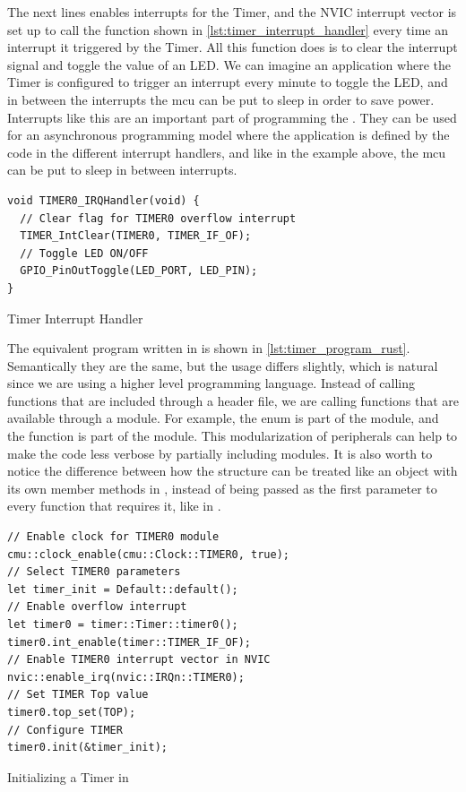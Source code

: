 The next lines enables interrupts for the Timer, and the NVIC interrupt vector is set up to call the function shown in \autoref{lst:timer_interrupt_handler} every time an interrupt it triggered by the Timer.
All this function does is to clear the interrupt signal and toggle the value of an LED.
We can imagine an application where the Timer is configured to trigger an interrupt every minute to toggle the LED, and in between the interrupts the \gls{mcu} can be put to sleep in order to save power.
Interrupts like this are an important part of programming the {\gecko}.
They can be used for an asynchronous programming model where the application is defined by the code in the different interrupt handlers, and like in the example above, the \gls{mcu} can be put to sleep in between interrupts.

\begin{listing}[h]
\begin{verbatim}
void TIMER0_IRQHandler(void) {
  // Clear flag for TIMER0 overflow interrupt
  TIMER_IntClear(TIMER0, TIMER_IF_OF);
  // Toggle LED ON/OFF
  GPIO_PinOutToggle(LED_PORT, LED_PIN);
}
\end{verbatim}
\caption{Timer Interrupt Handler}
\label{lst:timer_interrupt_handler}
\end{listing}

The equivalent program written in {\rust} is shown in \autoref{lst:timer_program_rust}.
Semantically they are the same, but the usage differs slightly, which is natural since we are using a higher level programming language.
Instead of calling functions that are included through a {\C} header file, we are calling functions that are available through a {\rust} module.
For example, the  enum is part of the  module, and the  function is part of the  module.
This modularization of peripherals can help to make the code less verbose by partially including modules.
It is also worth to notice the difference between how the  structure can be treated like an object with its own member methods in {\rust}, instead of being passed as the first parameter to every function that requires it, like in {\C}.

\begin{listing}[h]
\begin{verbatim}
// Enable clock for TIMER0 module
cmu::clock_enable(cmu::Clock::TIMER0, true);
// Select TIMER0 parameters
let timer_init = Default::default();
// Enable overflow interrupt
let timer0 = timer::Timer::timer0();
timer0.int_enable(timer::TIMER_IF_OF);
// Enable TIMER0 interrupt vector in NVIC
nvic::enable_irq(nvic::IRQn::TIMER0);
// Set TIMER Top value
timer0.top_set(TOP);
// Configure TIMER
timer0.init(&timer_init);
\end{verbatim}
\caption{Initializing a Timer in {\rust}}
\label{lst:timer_program_rust}
\end{listing}

